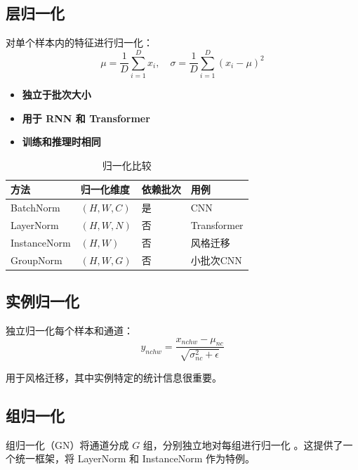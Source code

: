 \subsection{层归一化}

对单个样本内的特征进行归一化：
\begin{equation}
\mu = \frac{1}{D}\sum_{i=1}^{D} x_i, \quad \sigma = \frac{1}{D}\sum_{i=1}^{D}(x_i - \mu)^2
\end{equation}

\begin{itemize}
    \item \textbf{独立于批次大小}
    \item \textbf{用于 RNN 和 Transformer}
    \item \textbf{训练和推理时相同}
\end{itemize}

\begin{table}[ht]
    \centering
    \caption{归一化比较}
    \begin{tabular}{L{2cm} L{2.5cm} L{2.5cm} L{3cm}}
        \toprule
        \textbf{方法} & \textbf{归一化维度} & \textbf{依赖批次} & \textbf{用例} \\
        \midrule
        BatchNorm & $(H, W, C)$ & 是 & CNN \\
        LayerNorm & $(H, W, N)$ & 否 & Transformer \\
        InstanceNorm & $(H, W)$ & 否 & 风格迁移 \\
        GroupNorm & $(H, W, G)$ & 否 & 小批次CNN \\
        \bottomrule
    \end{tabular}
\end{table}

\subsection{实例归一化}

独立归一化每个样本和通道：
\begin{equation}
y_{nchw} = \frac{x_{nchw} - \mu_{nc}}{\sqrt{\sigma_{nc}^2 + \epsilon}}
\end{equation}

用于风格迁移，其中实例特定的统计信息很重要。

\subsection{组归一化}

组归一化（GN）将通道分成 $G$ 组，分别独立地对每组进行归一化 \cite{wu2018group}。这提供了一个统一框架，将 LayerNorm 和 InstanceNorm 作为特例。

